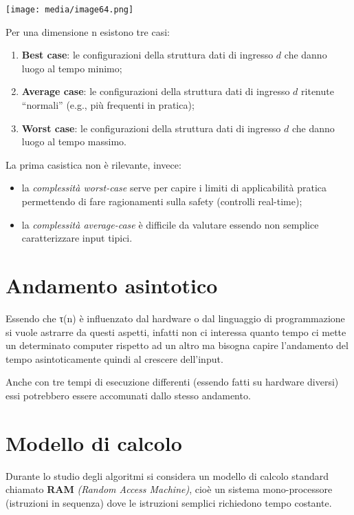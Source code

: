 \texttt{[image: media/image64.png]}

Per una dimensione n esistono tre casi:

\begin{enumerate}
\def\labelenumi{\arabic{enumi}.}
\item
  \textbf{Best case}: le configurazioni della struttura dati di ingresso
  \(d\) che danno luogo al tempo minimo;
\item
  \textbf{Average case}: le configurazioni della struttura dati di
  ingresso \(d\) ritenute ``normali'' (e.g., più frequenti in pratica);
\item
  \textbf{Worst case}: le configurazioni della struttura dati di
  ingresso \(d\) che danno luogo al tempo massimo.
\end{enumerate}

La prima casistica non è rilevante, invece:

\begin{itemize}
\item
  la \emph{complessità worst-case} serve per capire i limiti di
  applicabilità pratica permettendo di fare ragionamenti sulla safety
  (controlli real-time);
\item
  la \emph{complessità average-case} è difficile da valutare essendo non
  semplice caratterizzare input tipici.
\end{itemize}

\section{Andamento asintotico}\label{andamento-asintotico}

Essendo che τ(n) è influenzato dal hardware o dal linguaggio di
programmazione si vuole astrarre da questi aspetti, infatti non ci
interessa quanto tempo ci mette un determinato computer rispetto ad un
altro ma bisogna capire l'andamento del tempo asintoticamente quindi al
crescere dell'input.

Anche con tre tempi di esecuzione differenti (essendo fatti su hardware
diversi) essi potrebbero essere accomunati dallo stesso andamento.

\section{Modello di calcolo}\label{modello-di-calcolo}

Durante lo studio degli algoritmi si considera un modello di calcolo
standard chiamato \textbf{RAM} \emph{(Random Access Machine)}, cioè un
sistema mono-processore (istruzioni in sequenza) dove le istruzioni
semplici richiedono tempo costante.

